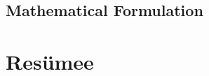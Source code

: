 \documentclass[
    fontsize=10pt,    %
    a4paper,      %
    parskip=half-,    %
    twoside,      %
    headings=big,  %
    appendixprefix=true,
    ]{scrreprt}    %
\begin{document}
\chapter{Mathematical Formulation}






%

%

%







\cleardoublepage



\part{Resümee}\label{part:resumee}
\end{document}
